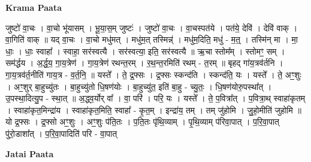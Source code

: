 \documentclass[17pt]{extarticle}
\begin{document}
\textbf{Krama Paata} \newline

जुष्टो॑ वा॒चः । वा॒चो भू॑यासम् । भू॒या॒स॒म् जुष्टः॑ । जुष्टो॑ वा॒चः । वा॒चस्पत॑ये । पत॑ये॒ देवि॑ । देवि॑ वाक् । वा॒गिति॑ वाक् ॥ यद् वा॒चः । वा॒चो मधु॑मत् । मधु॑म॒त् तस्मिन्न्॑ । मधु॑म॒दिति॒ मधु॑ - म॒त्॒ । तस्मि॑न् मा । मा॒ धाः॒ । धाः॒ स्वाहा᳚ । स्वाहा॒ सर॑स्वत्यै । सर॑स्वत्या॒ इति॒ सर॑स्वत्यै ॥ ऋ॒चा स्तोम᳚म् । स्तोमꣳ॒॒ सम् । सम॑र्द्धय । अ॒र्द्ध॒य॒ गा॒य॒त्रेण॑ । गा॒य॒त्रेण॑ रथन्त॒रम् । र॒थ॒न्त॒रमिति॑ रथम् - त॒रम् ॥ बृहद् गा॑य॒त्रव॑र्तनि । गा॒य॒त्रव॑र्त॒नीति॑ गाय॒त्र - व॒र्त॒नि॒ ॥ यस्ते᳚ । ते॒ द्र॒फ्सः । द्र॒फ्सः स्कन्द॑ति । स्कन्द॑ति॒ यः । यस्ते᳚ । ते॒ अꣳ॒॒शुः । अꣳ॒॒शुर् बा॒हुच्यु॑तः । बा॒हुच्यु॑तो धि॒षण॑योः । बा॒हुच्यु॑त॒ इति॑ बा॒हु - च्यु॒तः॒ । धि॒षण॑योरु॒पस्था᳚त् । उ॒पस्था॒दित्यु॒प - स्था॒त् ॥ अ॒द्ध्व॒र्योर् वा᳚ । वा॒ परि॑ । परि॒ यः । यस्ते᳚ । ते॒ प॒वित्रा᳚त् । प॒वित्रा॒थ् स्वाहा॑कृतम् । स्वाहा॑कृत॒मिन्द्रा॑य । स्वाहा॑कृत॒मिति॒ स्वाहा᳚ - कृ॒त॒म् । इन्द्रा॑य॒ तम् । तम् जु॑होमि । जु॒हो॒मीति॑ जुहोमि ॥ यो द्र॒फ्सः । द्र॒फ्सो अꣳ॒॒शुः । अꣳ॒॒शुः प॑ति॒तः । प॒ति॒तः पृ॑थि॒व्याम् । पृ॒थि॒व्याम् प॑रिवा॒पात् । प॒रि॒वा॒पात् पु॑रो॒डाशा᳚त् । प॒रि॒वा॒पादिति॑ परि - वा॒पात् \newline

\textbf{Jatai Paata} \newline
\end{document}
